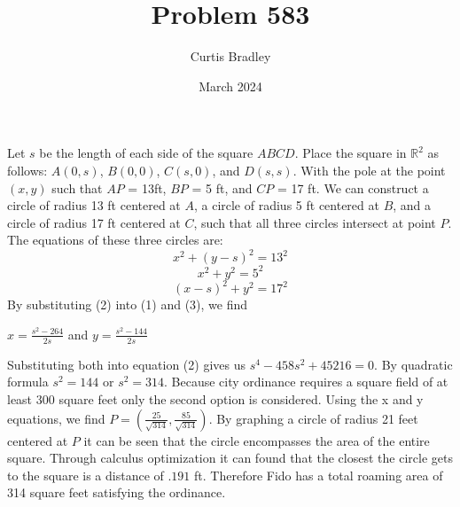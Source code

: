 \documentclass{article}
\title{Problem 583}
\author{Curtis Bradley}
\date{March 2024}
\begin{document}
Let $s$ be the length of each side of the square $ABCD$. Place the square in $\mathbb{R}^2$ as follows: $A(0,s)$, $B(0,0)$, $C(s,0)$, and $D(s,s)$. With the pole at the point $(x,y)$ such that $AP$ = 13ft, $BP$ = 5 ft, and $CP$ = 17 ft. We can construct a circle of radius 13 ft centered at $A$, a circle of radius 5 ft centered at $B$, and a circle of radius 17 ft centered at $C$, such that all three circles intersect at point $P$. The equations of these three circles are:
\begin{equation}
    x^2 + (y-s)^2 = 13^2
\end{equation}
\begin{equation}
    x^2+y^2 = 5^2
\end{equation}
\begin{equation}
    (x-s)^2 + y^2 = 17 ^2
\end{equation}
By substituting (2) into (1) and (3), we find 

\begin{center}
    $x = \frac{s^2-264}{2s}$ and $y=\frac{s^2 - 144}{2s}$
\end{center}
Substituting both into equation (2) gives us
$s^4 - 458s^2+ 45216 = 0$. By quadratic formula $s^2 = 144$ or $s^2 = 314$. Because city ordinance requires a square field of at least 300 square feet only the second option is considered. Using the x and y equations, we find $P = (\frac{25}{\sqrt{314}},\frac{85}{\sqrt{314}})$. By graphing a circle of radius 21 feet centered at $P$ it can be seen that the circle encompasses the area of the entire square. Through calculus optimization it can found that the closest the circle gets to the square is a distance of $.191$ ft. Therefore Fido has a total roaming area of 314 square feet satisfying the ordinance.
\end{document}
